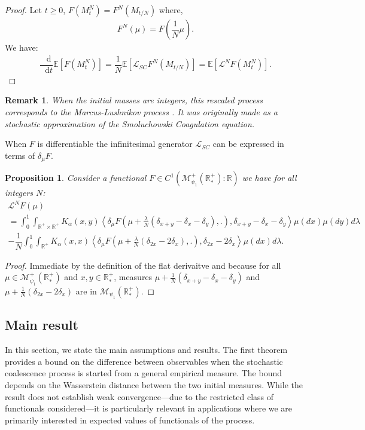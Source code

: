 \documentclass[11pt,a4paper]{article}
\newcommand{\RR}{\mathbb{R}}
\newcommand{\RRP}{\mathbb{R}^+_*}
\newcommand{\MC}{\mathcal{M}}
\newcommand{\LC}{\mathcal{L}}
\newcommand{\E}[1]{\mathbb{E}\left[#1\right]}
\newcommand{\dd}{\mathop{}\!\mathrm{d}}
\newtheorem{remark}[theorem]{Remark}
\newtheorem{proposition}[theorem]{Proposition}
\begin{document}
\begin{proof}
    Let $t \geq 0$, $F(M^N_t) = F^N(M_{t/N})$ where,
    \begin{align*}
        F^N(\mu) = F\left(\dfrac{1}{N}\mu\right).
    \end{align*}
    We have:
    \begin{align*}
        \dfrac{\dd}{\dd t}\E{F(M^N_t)}  = \dfrac{1}{N}\E{\LC_{SC} F^N\left(M_{t/N}\right)} =  \E{\LC^N F(M^N_t)}.
    \end{align*}
\end{proof}

\begin{remark}
   When the initial masses are integers, this rescaled process corresponds to the Marcus-Lushnikov process \cite{marcus1968stochastic,lushnikov1978coagulation}. It was originally made as a stochastic approximation of the Smoluchowski Coagulation equation.
\end{remark}
When $F$ is differentiable the infinitesimal generator $\LC_{SC}$ can be expressed in terms of $\delta_\mu F$.
\begin{proposition}\label{prop:SC_gen_differentiable}
    Consider a functional $F \in C^1(\MC_{\psi_1}^+\left(\RRP \right):\RR)$ we have for all integers $N$:
    \begin{multline*}
        \LC^N F(\mu)\\
         = \int_0^1 \int_{\RR^+ \times \RR^+} K_{\alpha}(x,y)\left\langle  \delta_\mu F\left(\mu + \frac{\lambda}{N}\left(\delta_{x + y} - \delta_x - \delta_y \right),.\right),\delta_{x+y} - \delta_x - \delta_y\right\rangle\mu(dx)\mu(dy)d\lambda \\
        -\dfrac{1}{N}\int_0^1\int_{\RR^+} K_{\alpha}(x,x)\left\langle  \delta_\mu F\left(\mu + \frac{\lambda}{N}\left(\delta_{2x} - 2\delta_x \right),.\right),\delta_{2x} - 2\delta_x \right\rangle\mu(dx)d\lambda.
    \end{multline*}
\end{proposition}
\begin{proof}
    Immediate by the definition of the flat derivaitve and because for all $\mu \in \MC_{\psi_1}^+\left(\RRP \right)$ and $x,y \in \RRP$, measures $\mu + \frac{1}{N}\left(\delta_{x + y} - \delta_x - \delta_y\right)$ and $\mu + \frac{1}{N}\left(\delta_{2x} - 2\delta_x \right)$ are in $\MC_{\psi_1}\left(\RRP \right)$.
\end{proof}

\subsection{Main result}
In this section, we state the main assumptions and results. The first theorem provides a bound on the difference between observables when the stochastic coalescence process is started from a general empirical measure. The bound depends on the Wasserstein distance between the two initial measures. While the result does not establish weak convergence—due to the restricted class of functionals considered—it is particularly relevant in applications where we are primarily interested in expected values of functionals of the process.
\end{document}
